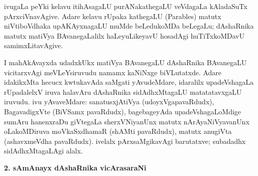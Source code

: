 ivugaLa peYki kelavu itihAsagaLU purANakathegaLU veVdagaLa kAladaSuTx pArxciVnavAgive. Adare kelavu rUpaka kathegaLU {\rm(Parables)} matutx niVtiboVdhaka upAKAyxnagaLU muMde beLedukoMDa beLegaLu; dAshaRnika matutx matiVya BAvanegaLalilx haLeyuLikeyavU hosadAgi huTiTxkoMDavU samimxLitavAgive.

I mahAkAvayxda udadxkUkx matiVya BAvanegaLU dAshaRnika BAvanegaLU vicitarx\-vAgi meVLeYsiruvudu namamx kaNiNxge biVLutatxde. Adare idakikxMta hecucx kwtukavAda \hbox{saMgati} yAvudeMdare, idaralilx upadeVshagaLa rUpadalelxV iruva halavAru dAshaRnika sidAdhxMtagaLU matatatavxgaLU iruvudu. ivu yAvaveMdare: sanatusxjAtiVya (udoyxVgapavaRdudx), BagavadigxVte (BiVSamx pavaRdudx), bagebageyAda upadeVsha\-gaLoMdige sumAru hanenxraDu giVtegaLa sherxVNiyanUnx matutx nArAyaNiVyavanUnx oLakoMDiruva moVkaSxdhamaR (shAMti pavaRdudx), matutx anugiVta (ashavxmeVdha pavaRdudx). ivelalx pArxsaMgikavAgi barutatxve; subadadhx sidAdhxMtagaLAgi alalx.

\bigskip
\begin{center}
{\Large\bf 2. sAmAnayx dAshaRnika vicArasaraNi}
\end{center}


